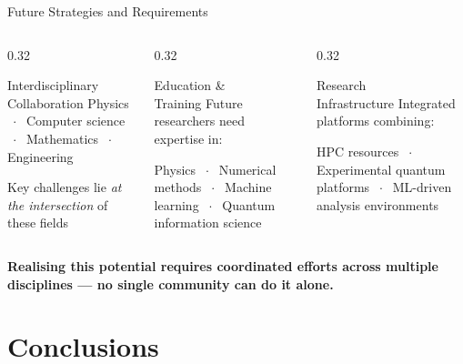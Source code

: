 \documentclass[aspectratio=169]{beamer}
\begin{document}
\begin{frame}{Future Strategies and Requirements}

  \begin{columns}[T]
    \begin{column}{0.32\textwidth}
      \begin{block}{\centering Interdisciplinary\\Collaboration}
        \centering\medskip
        Physics $\;\cdot\;$ Computer science $\;\cdot\;$
        Mathematics $\;\cdot\;$ Engineering
        \medskip

        \small Key challenges lie \emph{at the intersection}
        of these fields
      \end{block}
    \end{column}
    \begin{column}{0.32\textwidth}
      \begin{block}{\centering Education \&\\Training}
        \centering\medskip
        Future researchers need expertise in:
        \medskip

        \small Physics $\;\cdot\;$ Numerical methods $\;\cdot\;$
        Machine learning $\;\cdot\;$ Quantum information science
      \end{block}
    \end{column}
    \begin{column}{0.32\textwidth}
      \begin{block}{\centering Research\\Infrastructure}
        \centering\medskip
        Integrated platforms combining:
        \medskip

        \small HPC resources $\;\cdot\;$ Experimental quantum platforms $\;\cdot\;$
        ML-driven analysis environments
      \end{block}
    \end{column}
  \end{columns}

  \bigskip
  \begin{center}
    \textcolor{mqblue}{\bfseries
    Realising this potential requires coordinated efforts across
    multiple disciplines — no single community can do it alone.}
  \end{center}

\end{frame}

\section{Conclusions}
\end{document}
